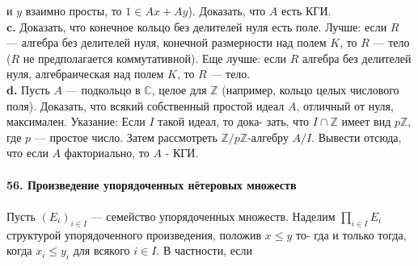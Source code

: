 и $y$ взаимно просты, то $1\in Ax+Ay$). Доказать, что $A$ есть КГИ.
\\
\hspace*{10pt}\textbf{c.} Доказать, что конечное кольцо без делителей нуля есть поле.\linebreak
Лучше: если $R$ — алгебра без делителей нуля, конечной размерности\linebreak
над полем $K$, то $R$ — тело ($R$ не предполагается коммутативной). Еще\linebreak
лучше: если $R$ алгебра без делителей нуля, алгебраическая над полем\linebreak
$K$, то $R$ — тело.
\\
\hspace*{10pt}\textbf{d.} Пусть $A$ — подкольцо в $\mathbb{C}$, целое для $\mathbb{Z}$ (например, кольцо целых\linebreak
числового поля). Доказать, что всякий собственный простой идеал $A$,\linebreak
отличный от нуля, максимален. Указание: Если $I$ такой идеал, то дока-\linebreak
зать, что $I \cap\mathbb{Z}$ имеет вид $p\mathbb{Z}$, где $p$ — простое число. Затем рассмотреть\linebreak
$\mathbb{Z}/p\mathbb{Z}$-алгебру $A/I$. Вывести отсюда, что если $A$ факториально, то $A$ -\linebreak
КГИ.
\\
\\
\noindent\textbf{56. Произведение упорядоченных нётеровых множеств}\\\\
\hspace*{10pt} Пусть $(E_i)_{i\in I}$ — семейство упорядоченных множеств. Наделим\linebreak
$\prod_{i\in I} E_i$ структурой упорядоченного произведения, положив $x\leq y$ то-\linebreak
гда и только тогда, когда $x_i\leq y_i$ для всякого $i\in I$. В частности, если\linebreak\pagebreak



